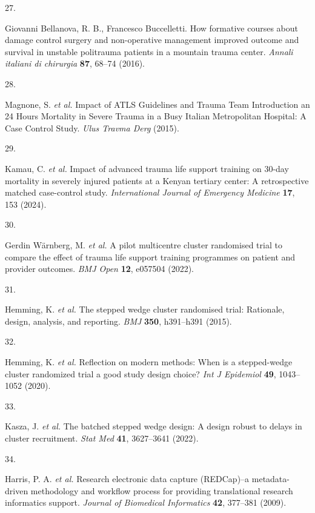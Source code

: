 \documentclass[
]{scrartcl}
\newlength{\cslhangindent}
\newlength{\csllabelwidth}
\newlength{\cslentryspacingunit} %
\newenvironment{CSLReferences}[2] %
 {%
  \setlength{\parindent}{0pt}
  \ifodd #1
  \let\oldpar\par
  \def\par{\hangindent=\cslhangindent\oldpar}
  \fi
  \setlength{\parskip}{#2\cslentryspacingunit}
 }%
 {}
\newcommand{\CSLLeftMargin}[1]{\parbox[t]{\csllabelwidth}{#1}}
\newcommand{\CSLRightInline}[1]{\parbox[t]{\linewidth - \csllabelwidth}{#1}\break}
\begin{document}
\begin{CSLReferences}{0}{0}
\leavevmode{}%
\CSLLeftMargin{27. }%
\CSLRightInline{Giovanni Bellanova, R. B., Francesco Buccelletti. How
formative courses about damage control surgery and non-operative
management improved outcome and survival in unstable politrauma patients
in a mountain trauma center. \emph{Annali italiani di chirurgia}
\textbf{87}, 68--74 (2016).}

\leavevmode{}%
\CSLLeftMargin{28. }%
\CSLRightInline{Magnone, S. \emph{et al.} Impact of {ATLS} {Guidelines}
and {Trauma} {Team} {Introduction} an 24 {Hours} {Mortality} in {Severe}
{Trauma} in a {Busy} {Italian} {Metropolitan} {Hospital}: A {Case}
{Control} {Study}. \emph{Ulus Travma Derg} (2015).}

\leavevmode{}%
\CSLLeftMargin{29. }%
\CSLRightInline{Kamau, C. \emph{et al.} Impact of advanced trauma life
support training on 30-day mortality in severely injured patients at a
{Kenyan} tertiary center: A retrospective matched case-control study.
\emph{International Journal of Emergency Medicine} \textbf{17}, 153
(2024).}

\leavevmode{}%
\CSLLeftMargin{30. }%
\CSLRightInline{Gerdin Wärnberg, M. \emph{et al.} A pilot multicentre
cluster randomised trial to compare the effect of trauma life support
training programmes on patient and provider outcomes. \emph{BMJ Open}
\textbf{12}, e057504 (2022).}

\leavevmode{}%
\CSLLeftMargin{31. }%
\CSLRightInline{Hemming, K. \emph{et al.} The stepped wedge cluster
randomised trial: Rationale, design, analysis, and reporting. \emph{BMJ}
\textbf{350}, h391--h391 (2015).}

\leavevmode{}%
\CSLLeftMargin{32. }%
\CSLRightInline{Hemming, K. \emph{et al.} Reflection on modern methods:
When is a stepped-wedge cluster randomized trial a good study design
choice? \emph{Int J Epidemiol} \textbf{49}, 1043--1052 (2020).}

\leavevmode{}%
\CSLLeftMargin{33. }%
\CSLRightInline{Kasza, J. \emph{et al.} The batched stepped wedge
design: A design robust to delays in cluster recruitment. \emph{Stat
Med} \textbf{41}, 3627--3641 (2022).}

\leavevmode{}%
\CSLLeftMargin{34. }%
\CSLRightInline{Harris, P. A. \emph{et al.} Research electronic data
capture ({REDCap})--a metadata-driven methodology and workflow process
for providing translational research informatics support. \emph{Journal
of Biomedical Informatics} \textbf{42}, 377--381 (2009).}


\end{CSLReferences}
\end{document}
